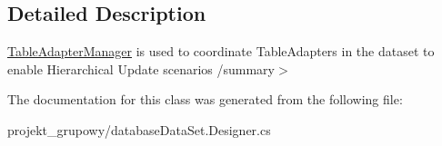 \subsection{Detailed Description}
\hyperlink{classprojekt__grupowy_1_1database_data_set_table_adapters_1_1_table_adapter_manager}{Table\+Adapter\+Manager} is used to coordinate Table\+Adapters in the dataset to enable Hierarchical Update scenarios /summary$>$ 

The documentation for this class was generated from the following file\+:\begin{DoxyCompactItemize}
\item 
projekt\+\_\+grupowy/database\+Data\+Set.\+Designer.\+cs\end{DoxyCompactItemize}

